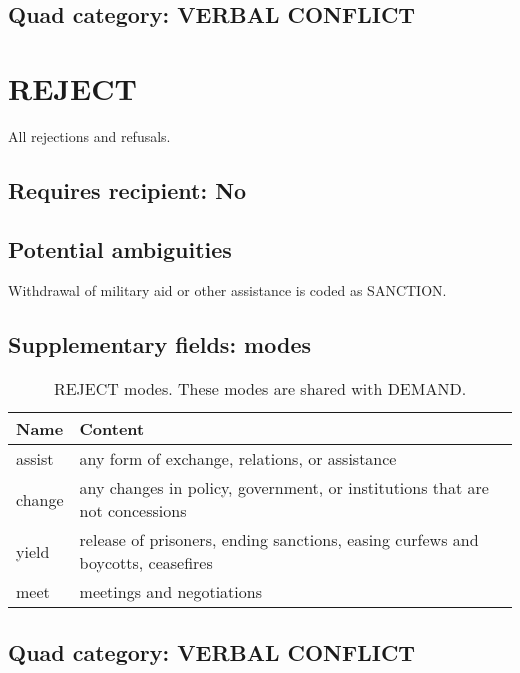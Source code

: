\documentclass[11pt]{report}
\newcommand{\plcat}[1]{\textsf{#1}}
\begin{document}
\subsection{Quad category: VERBAL CONFLICT}

\newpage  


\section{REJECT}

All rejections and refusals. 

\subsection{Requires recipient: No}

\subsection{Potential ambiguities}

Withdrawal of military aid or other assistance is coded as \plcat{SANCTION}.


\subsection{Supplementary fields: modes}

\begin{table}[htp]
\caption{\plcat{REJECT} modes. These modes are shared with \plcat{DEMAND}.}
\begin{center}
\begin{tabular}{|l|p{13cm}|}
\hline
Name & Content \\
\hline
assist & any form of exchange, relations, or assistance\\
change & any changes in policy, government, or institutions that are not concessions \\
yield & release of prisoners, ending sanctions, easing curfews and boycotts, ceasefires\\
meet & meetings and negotiations\\
\hline
\end{tabular}
\end{center}
\label{tab:rejectmode}
\end{table}%

 
\subsection{Quad category: VERBAL CONFLICT}
\end{document}
